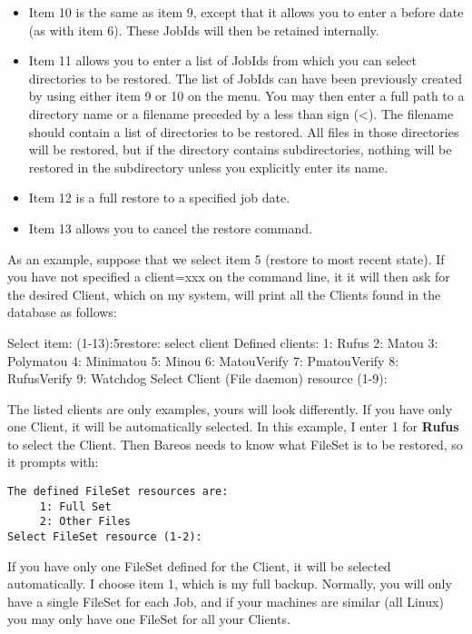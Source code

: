 \begin{itemize}
\item Item 10 is the same as item 9, except that it allows you to enter
   a before date (as with item 6). These JobIds will then be retained
   internally.

\item Item 11 allows you to enter a list of JobIds from which you can
   select directories to be restored. The list of JobIds can have been
   previously created by using either item 9 or 10 on the menu.  You
   may then enter a full path to a directory name or a filename preceded
   by a less than sign ({\textless}). The filename should contain a list
   of directories to be restored.  All files in those directories will
   be restored, but if the directory contains subdirectories, nothing
   will be restored in the subdirectory unless you explicitly enter its
   name.

\item Item 12 is a full restore to a specified job date.

\item Item 13 allows you to cancel the restore command.
\end{itemize}

As an example, suppose that we select item 5 (restore to most recent state).
If you have not specified a client=xxx on the command line, it
it will then ask for the desired Client, which on my system, will print all
the Clients found in the database as follows:

\begin{bconsole}{Select item:  (1-13):}{5}{restore: select client}{}
Defined clients:
     1: Rufus
     2: Matou
     3: Polymatou
     4: Minimatou
     5: Minou
     6: MatouVerify
     7: PmatouVerify
     8: RufusVerify
     9: Watchdog
Select Client (File daemon) resource (1-9):
\end{bconsole}

The listed clients are only examples, yours will look differently.
If you have only one Client, it will be automatically selected.
In this example, I enter 1 for
{\bf Rufus} to select the Client.
Then Bareos needs to know what FileSet is
to be restored, so it prompts with:

\footnotesize
\begin{verbatim}
The defined FileSet resources are:
     1: Full Set
     2: Other Files
Select FileSet resource (1-2):
\end{verbatim}
\normalsize

If you have only one FileSet defined for the Client, it will be selected
automatically.  I choose item 1, which is my full backup.  Normally, you
will only have a single FileSet for each Job, and if your machines are
similar (all Linux) you may only have one FileSet for all your Clients.

